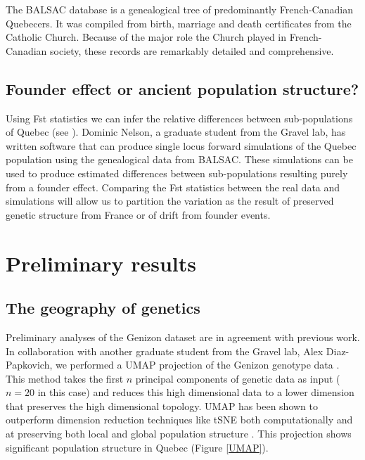 \documentclass[
11pt, %
oneside, %
english, %
doublespacing, %
headsepline, %
chapterinoneline, %
]{MastersDoctoralThesis} %
\begin{document}
The BALSAC database is a genealogical tree of predominantly French-Canadian Quebecers.
It was compiled from birth, marriage and death certificates from the Catholic Church.
Because of the major role the Church played in French-Canadian society, these records are remarkably detailed and comprehensive.

\subsection{Founder effect or ancient population structure?}
Using Fst statistics we can infer the relative differences between sub-populations of Quebec (see \citep{Roy-Gagnon2011}).
Dominic Nelson, a graduate student from the Gravel lab, has written software that can produce single locus forward simulations of the Quebec population using the genealogical data from BALSAC.
These simulations can be used to produce estimated differences between sub-populations resulting purely from a founder effect.
Comparing the Fst statistics between the real data and simulations will allow us to partition the variation as the result of preserved genetic structure from France or of drift from founder events.

\section{Preliminary results}

\subsection{The geography of genetics}

Preliminary analyses of the Genizon dataset are in agreement with previous work.
In collaboration with another graduate student from the Gravel lab, Alex Diaz-Papkovich, we performed a UMAP projection of the Genizon genotype data \citep{mcinnes2018umap,diaz2018}.
This method takes the first $n$ principal components of genetic data as input ($n = 20$ in this case) and reduces this high dimensional data to a lower dimension that preserves the high dimensional topology.
UMAP has been shown to outperform dimension reduction techniques like tSNE both computationally and at preserving both local and global population structure \citep{diaz2018, mcinnes2018umap}.
This projection shows significant population structure in Quebec (Figure \ref{UMAP}). 
\end{document}
